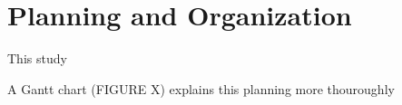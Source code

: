 \newpage
\section{Planning and Organization}

This study 



A Gantt chart (FIGURE X) explains this planning more thouroughly